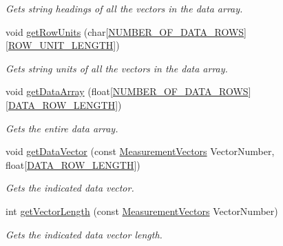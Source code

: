 \begin{DoxyCompactItemize}
\begin{DoxyCompactList}\small\item\em Gets string headings of all the vectors in the data array. \end{DoxyCompactList}\item 
void \mbox{\hyperlink{class_data_source_abf7e2f4954b1c314fba8f0ac3194306e}{get\+Row\+Units}} (char\mbox{[}\mbox{\hyperlink{_s_p_i___instruction_set_8h_a030a0b94acdc35db8cf20a5044a1c775}{N\+U\+M\+B\+E\+R\+\_\+\+O\+F\+\_\+\+D\+A\+T\+A\+\_\+\+R\+O\+WS}}\mbox{]}\mbox{[}\mbox{\hyperlink{_s_p_i___instruction_set_8h_af45194e4246701e52a2d67f27cc3ffb8}{R\+O\+W\+\_\+\+U\+N\+I\+T\+\_\+\+L\+E\+N\+G\+TH}}\mbox{]})
\begin{DoxyCompactList}\small\item\em Gets string units of all the vectors in the data array. \end{DoxyCompactList}\item 
void \mbox{\hyperlink{class_data_source_a83bdf3c6a0c54d468dad3e73509c90e6}{get\+Data\+Array}} (float\mbox{[}\mbox{\hyperlink{_s_p_i___instruction_set_8h_a030a0b94acdc35db8cf20a5044a1c775}{N\+U\+M\+B\+E\+R\+\_\+\+O\+F\+\_\+\+D\+A\+T\+A\+\_\+\+R\+O\+WS}}\mbox{]}\mbox{[}\mbox{\hyperlink{_s_p_i___instruction_set_8h_afaade7aab877c51eaea08012fa5a7ce2}{D\+A\+T\+A\+\_\+\+R\+O\+W\+\_\+\+L\+E\+N\+G\+TH}}\mbox{]})
\begin{DoxyCompactList}\small\item\em Gets the entire data array. \end{DoxyCompactList}\item 
void \mbox{\hyperlink{class_data_source_a924875bd657b56f140604551270cdbc0}{get\+Data\+Vector}} (const \mbox{\hyperlink{_s_p_i___instruction_set_8h_a9d8048399836e11887f85cc8dc3d75d5}{Measurement\+Vectors}} Vector\+Number, float\mbox{[}\mbox{\hyperlink{_s_p_i___instruction_set_8h_afaade7aab877c51eaea08012fa5a7ce2}{D\+A\+T\+A\+\_\+\+R\+O\+W\+\_\+\+L\+E\+N\+G\+TH}}\mbox{]})
\begin{DoxyCompactList}\small\item\em Gets the indicated data vector. \end{DoxyCompactList}\item 
int \mbox{\hyperlink{class_data_source_a49998f22c00d924daf7b67af48e10a30}{get\+Vector\+Length}} (const \mbox{\hyperlink{_s_p_i___instruction_set_8h_a9d8048399836e11887f85cc8dc3d75d5}{Measurement\+Vectors}} Vector\+Number)
\begin{DoxyCompactList}\small\item\em Gets the indicated data vector length. \end{DoxyCompactList}\item 

\end{DoxyCompactItemize}
